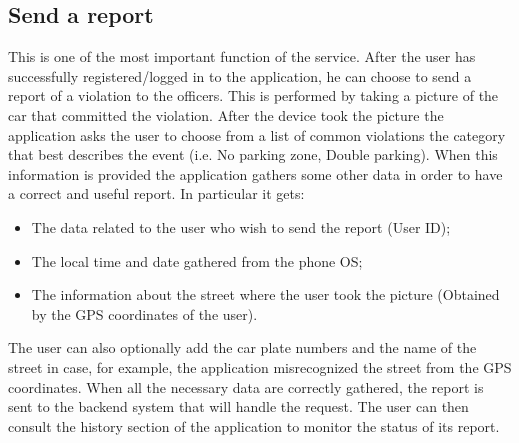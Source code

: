 \subsection{Send a report}
This is one of the most important function of the service. After the user has successfully registered/logged in to the application, he can choose to send a report of a violation to the officers. This is performed by taking a picture of the car that committed the violation. After the device took the picture the application asks the user to choose from a list of common violations the category that best describes the event (i.e. No parking zone, Double parking). When this information is provided the application gathers some other data in order to have a correct and useful report. In particular it gets: 
\begin{itemize}
  \item The data related to the user who wish to send the report (User ID);
  \item The local time and date gathered from the phone OS;
  \item The information about the street where the user took the picture (Obtained by the GPS coordinates of the user).
\end{itemize}

The user can also optionally add the car plate numbers and the name of the street in case, for example, the application misrecognized the street from the GPS coordinates. When all the necessary data are correctly gathered, the report is sent to the backend system that will handle the request. The user can then consult the history section of the application to monitor the status of its report.

